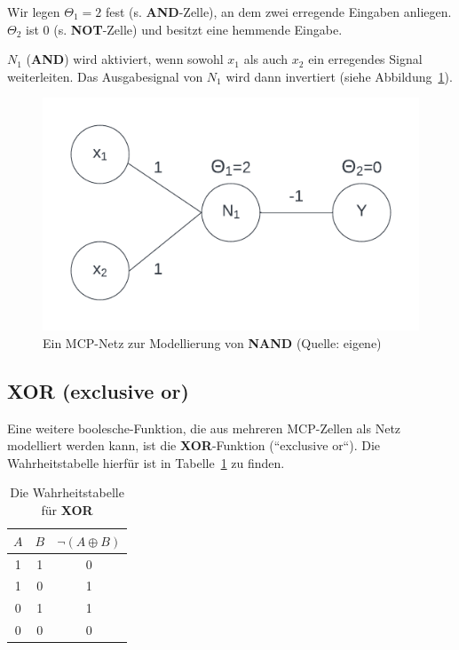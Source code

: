 {Wir legen $\Theta_1 = 2$ fest (s. \textbf{AND}-Zelle), an dem zwei erregende Eingaben anliegen. $\Theta_2$ ist $0$ (s. \textbf{NOT}-Zelle) und besitzt eine hemmende Eingabe.

$N_1$ (\textbf{AND}) wird aktiviert, wenn sowohl $x_1$ als auch $x_2$ ein erregendes Signal weiterleiten. Das Ausgabesignal von $N_1$  wird dann invertiert (siehe Abbildung~\ref{fig:mcpnand}).


\begin{figure}[h]
    \centering
    \includegraphics{chapters/3. Kuenstliche Neuronen/mcpnand}
    \caption{Ein MCP-Netz zur Modellierung von \textbf{NAND} (Quelle: eigene)}
    \label{fig:mcpnand}
\end{figure}


\subsection*{XOR (exclusive or)}

Eine weitere boolesche-Funktion, die aus mehreren MCP-Zellen als Netz modelliert werden kann, ist die \textbf{XOR}-Funktion (``exclusive or``). Die Wahrheitstabelle hierfür ist in Tabelle~\ref{tab:xor} zu finden.

\begin{table} %
    \centering
    \begin{tabular}{c | c | c}
        $A$ & $B$ & $\neg(A \oplus B)$ \\
        \hline
        1   & 1   & 0           \\
        1   & 0   & 1           \\
        0   & 1   & 1           \\
        0   & 0   & 0           \\
    \end{tabular}
    \caption{Die Wahrheitstabelle für \textbf{XOR}}
    \label{tab:xor}
\end{table}


}
